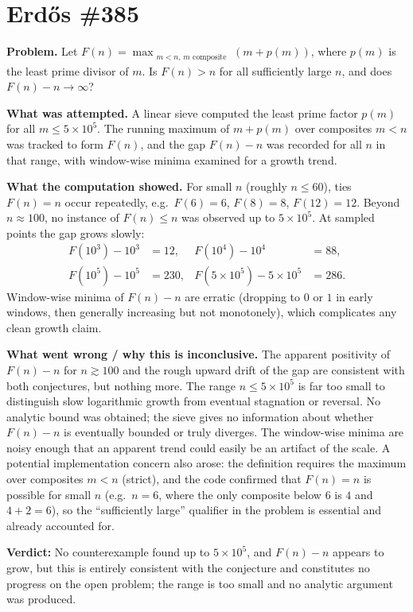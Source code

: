 \section{Erd\H{o}s \#385}

\textbf{Problem.} Let $F(n) = \max_{\substack{m < n,\, m \text{ composite}}} (m + p(m))$, where $p(m)$ is the least prime divisor of $m$. Is $F(n) > n$ for all sufficiently large $n$, and does $F(n) - n \to \infty$?

\textbf{What was attempted.} A linear sieve computed the least prime factor $p(m)$ for all $m \leq 5 \times 10^5$. The running maximum of $m + p(m)$ over composites $m < n$ was tracked to form $F(n)$, and the gap $F(n) - n$ was recorded for all $n$ in that range, with window-wise minima examined for a growth trend.

\textbf{What the computation showed.} For small $n$ (roughly $n \leq 60$), ties $F(n) = n$ occur repeatedly, e.g.\ $F(6) = 6$, $F(8) = 8$, $F(12) = 12$. Beyond $n \approx 100$, no instance of $F(n) \leq n$ was observed up to $5 \times 10^5$. At sampled points the gap grows slowly:
\begin{align*}
F(10^3) - 10^3 &= 12, & F(10^4) - 10^4 &= 88,\\
F(10^5) - 10^5 &= 230, & F(5\times 10^5) - 5\times 10^5 &= 286.
\end{align*}
Window-wise minima of $F(n)-n$ are erratic (dropping to $0$ or $1$ in early windows, then generally increasing but not monotonely), which complicates any clean growth claim.

\textbf{What went wrong / why this is inconclusive.} The apparent positivity of $F(n)-n$ for $n \gtrsim 100$ and the rough upward drift of the gap are consistent with both conjectures, but nothing more. The range $n \leq 5 \times 10^5$ is far too small to distinguish slow logarithmic growth from eventual stagnation or reversal. No analytic bound was obtained; the sieve gives no information about whether $F(n) - n$ is eventually bounded or truly diverges. The window-wise minima are noisy enough that an apparent trend could easily be an artifact of the scale. A potential implementation concern also arose: the definition requires the maximum over composites $m < n$ (strict), and the code confirmed that $F(n) = n$ is possible for small $n$ (e.g.\ $n=6$, where the only composite below $6$ is $4$ and $4+2=6$), so the ``sufficiently large'' qualifier in the problem is essential and already accounted for.

\textbf{Verdict:} No counterexample found up to $5 \times 10^5$, and $F(n)-n$ appears to grow, but this is entirely consistent with the conjecture and constitutes no progress on the open problem; the range is too small and no analytic argument was produced.
